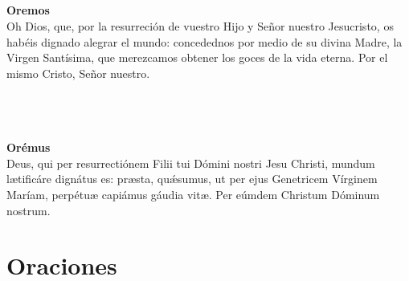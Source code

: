 \documentclass[10pt,a4paper,oneside]{book}
\begin{document}
\begin{minipage}[t]{0.475\textwidth}
      \\
      \\
      \\\\
      \textbf{Oremos}\\
      Oh Dios, que, por la resurreción de vuestro Hijo y Señor nuestro Jesucristo, os habéis dignado alegrar el mundo: 
      concedednos por medio de su divina Madre, la Virgen Santísima, que merezcamos obtener los goces de la vida eterna. 
      Por el mismo Cristo, Señor nuestro. 
\end{minipage}
\begin{minipage}[t]{0.475\textwidth}
      \\[1mm]
      \\[1mm]
      \\[2mm]
      \textbf{Orémus}\\
      Deus, qui per resurrectiónem Filii tui Dómini nostri Jesu Christi,
      mundum l{\ae}tificáre dignátus es: pr{\ae}sta, qu{\'\ae}sumus, ut per ejus Genetricem Vírginem Maríam,
      perpétu{\ae} capiámus gáudia vit{\ae}. Per eúmdem Christum Dóminum nostrum. 
\end{minipage}
\chapter*{Oraciones}
\end{document}
